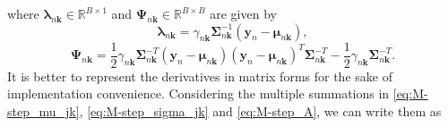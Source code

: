 \documentclass[twocolumn,english]{IEEEtran}
\theoremstyle{plain}
\begin{document}
where $\boldsymbol{\lambda}_{n\mathbf{k}}\in\mathbb{R}^{B\times1}$
and $\boldsymbol{\Psi}_{n\mathbf{k}}\in\mathbb{R}^{B\times B}$ are
given by 
\begin{equation}
\boldsymbol{\lambda}_{n\mathbf{k}}=\gamma_{n\mathbf{k}}\boldsymbol{\Sigma}_{n\mathbf{k}}^{-1}\left(\mathbf{y}_{n}-\boldsymbol{\mu}_{n\mathbf{k}}\right),\label{eq:lambda_nk}
\end{equation}
\begin{equation}
\boldsymbol{\Psi}_{n\mathbf{k}}=\frac{1}{2}\gamma_{n\mathbf{k}}\boldsymbol{\Sigma}_{n\mathbf{k}}^{-T}\left(\mathbf{y}_{n}-\boldsymbol{\mu}_{n\mathbf{k}}\right)\left(\mathbf{y}_{n}-\boldsymbol{\mu}_{n\mathbf{k}}\right)^{T}\boldsymbol{\Sigma}_{n\mathbf{k}}^{-T}-\frac{1}{2}\gamma_{n\mathbf{k}}\boldsymbol{\Sigma}_{n\mathbf{k}}^{-T}.\label{eq:psi_nk}
\end{equation}
It is better to represent the derivatives in matrix forms for the
sake of implementation convenience. Considering the multiple summations
in \eqref{eq:M-step_mu_jk}, \eqref{eq:M-step_sigma_jk} and \eqref{eq:M-step_A},
we can write them as
\end{document}

